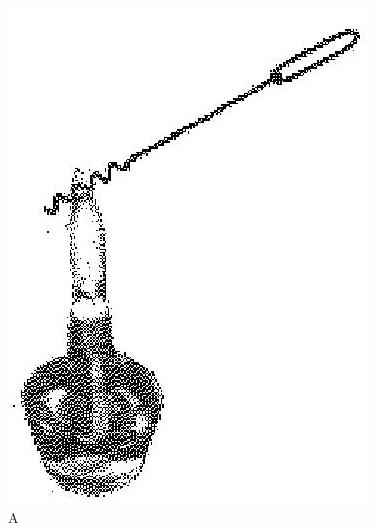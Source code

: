 \documentclass[10pt]{article}
\begin{document}
\begin{figure}[h]
\begin{center}
  \includegraphics[width=\textwidth]{2025_10_23_fa9073eecee116ad8cf2g-81(2)}
\captionsetup{labelformat=empty}
\caption{A}
\end{center}
\end{figure}
\end{document}
